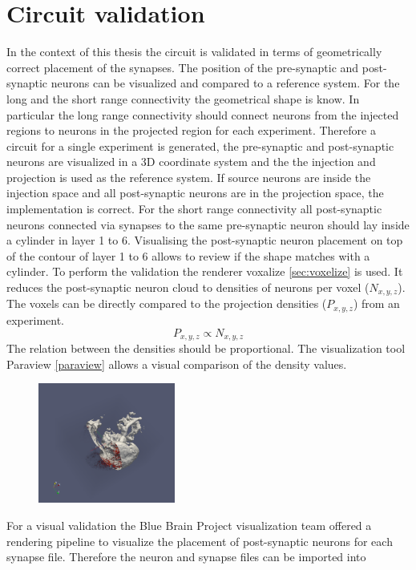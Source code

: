 \newpage
\section{Circuit validation}
In the context of this thesis the circuit is validated in terms of geometrically correct placement of
the synapses. The position of the pre-synaptic and post-synaptic neurons can be visualized and  compared to a 
reference system. For the long and the short range connectivity the geometrical shape is know.
In particular the long range connectivity should connect neurons from the injected regions to neurons
in the projected region for each experiment. Therefore a circuit for a single experiment is 
generated, the pre-synaptic and post-synaptic neurons are visualized in a 3D coordinate system and the the injection
and projection is used as the reference system. If source neurons are inside the injection space and all
post-synaptic neurons are in the projection space, the implementation is correct.
For the short range connectivity all post-synaptic neurons connected via synapses to the same pre-synaptic neuron should
lay inside a cylinder in layer 1 to 6. Visualising the post-synaptic neuron placement on top of the contour of layer 1 to 6 allows to review if the shape matches with a cylinder.
To perform the validation the renderer voxalize \ref{sec:voxelize} is used.
It reduces the post-synaptic neuron cloud to densities of neurons per voxel ($N_{x,y,z}$).
The voxels can be directly compared to the projection densities ($P_{x,y,z}$) from an experiment.
\begin{equation}
	P_{x,y,z} \propto N_{x,y,z}
\end{equation}
The relation between the densities should be proportional.
The visualization tool Paraview \ref{paraview} allows a visual comparison of the density values.
 \begin{figure}[ht!]
\centering
\includegraphics[width=0.4\textwidth]{pictures/paraview_ex.png}
\end{figure}
For a visual validation the Blue Brain Project visualization team offered a rendering pipeline to visualize the placement of post-synaptic neurons for each synapse file. Therefore the neuron and synapse files can be imported into 
